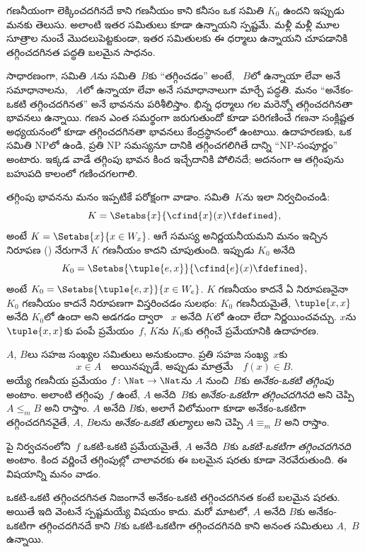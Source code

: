 \documentclass[../../../include/open-logic-section]{subfiles}
\begin{document}

\begin{explain}
గణనీయంగా లెక్కించదగినదే కాని గణనీయం కాని కనీసం ఒక సమితి $K_0$
ఉందని ఇప్పుడు మనకు తెలుసు. అలాంటి ఇతర సమితులు కూడా ఉన్నాయని స్పష్టమే.
మళ్లీ మళ్లీ మూల సూత్రాల నుంచే మొదలుపెట్టకుండా, ఇతర సమితులకు ఈ ధర్మాలు
ఉన్నాయని చూపడానికి తగ్గించదగినత పద్ధతి బలమైన సాధనం.

సాధారణంగా, సమితి $A$ను సమితి~$B$కు ``తగ్గించడం'' అంటే,
~$B$లో ఉన్నాయా లేవా అనే సమాధానాలను,
~$A$లో ఉన్నాయా లేవా అనే
సమాధానాలుగా మార్చే పద్ధతి. మనం ``అనేకం-ఒకటి తగ్గించదగినత'' అనే
భావనను పరిశీలిస్తాం. భిన్న ధర్మాలు గల మరెన్నో తగ్గించదగినతా
భావనలు ఉన్నాయి. గణన ఎంత సమర్థంగా జరుగుతుందో కూడా పరిగణించే గణనా సంక్లిష్టత
అధ్యయనంలో కూడా తగ్గించదగినతా భావనలు కేంద్రస్థానంలో ఉంటాయి. ఉదాహరణకు,
ఒక సమితి NPలో ఉండి, ప్రతి NP సమస్యనూ దానికి తగ్గించగలిగితే దాన్ని
``NP-సంపూర్ణం'' అంటారు. ఇక్కడ వాడే తగ్గింపు భావన కింద ఇచ్చేదానికి
పోలినదే; అదనంగా ఆ తగ్గింపును బహుపది కాలంలో గణించగలగాలి.

తగ్గింపు భావనను మనం ఇప్పటికే పరోక్షంగా వాడాం. సమితి~$K$ను ఇలా
నిర్వచించండి:
\[
K = \Setabs{x}{\cfind{x}(x) \fdefined},
\]
అంటే $K=\Setabs{x}{x\in W_x}$. ఆగే సమస్య అనిర్ణయనీయమని మనం ఇచ్చిన
నిరూపణ () నేరుగానే $K$ గణనీయం
కాదని చూపుతుంది.
ఇప్పుడు $K_0$ అనేది
\[
K_0 = \Setabs{\tuple{e, x}}{\cfind{e}(x) \fdefined},
\]
అంటే $K_0=\Setabs{\tuple{e,x}}{x\in W_e}$. $K$ గణనీయం కాదనే ఏ
నిరూపణనైనా $K_0$ గణనీయం కాదనే నిరూపణగా విస్తరించడం సులభం:
$K_0$ గణనీయమైతే, $\tuple{x,x}$ అనేది $K_0$లో ఉందా అని అడగడం ద్వారా
~$x$ అనేది $K$లో ఉందా లేదా
నిర్ణయించవచ్చు. $x$ను $\tuple{x,x}$కు
పంపే ప్రమేయం~$f$, $K$ను $K_0$కు తగ్గించే ప్రమేయానికి ఉదాహరణ.
\end{explain}

\begin{defn}
$A$, $B$లు సహజ సంఖ్యల సమితులు అనుకుందాం. ప్రతి సహజ సంఖ్య~$x$కు
\[
x \in A \quad \text{అయినప్పుడే, అప్పుడు మాత్రమే} \quad f(x) \in B.
\]
అయ్యే గణనీయ ప్రమేయం $f\colon\Nat\to\Nat$ను $A$ నుంచి~$B$కు
\emph{అనేకం-ఒకటి తగ్గింపు} అంటాం. అలాంటి తగ్గింపు~$f$ ఉంటే, $A$
అనేది~$B$కు \emph{అనేకం-ఒకటిగా తగ్గించదగినది} అని చెప్పి
$A\leq_m B$ అని రాస్తాం. $A$ అనేది $B$కు, అలాగే విలోమంగా కూడా
అనేకం-ఒకటిగా తగ్గించదగినవైతే, $A$, $B$లను \emph{అనేకం-ఒకటి
తుల్యాలు} అని చెప్పి $A\equiv_m B$ అని రాస్తాం.
\end{defn}

పై నిర్వచనంలోని~$f$ ఒకటి-ఒకటి ప్రమేయమైతే, $A$ అనేది~$B$కు
\emph{ఒకటి-ఒకటిగా తగ్గించదగినది} అంటాం. కింద వర్ణించే తగ్గింపుల్లో
చాలావరకు ఈ బలమైన షరతు కూడా నెరవేరుతుంది. ఈ విషయాన్ని మనం
వాడం.

\begin{digress}
ఒకటి-ఒకటి తగ్గించదగినత నిజంగానే అనేకం-ఒకటి తగ్గించదగినత కంటే బలమైన
షరతు. అయితే ఇది వెంటనే స్పష్టమయ్యే విషయం కాదు. మరో మాటలో,
$A$ అనేది $B$కు అనేకం-ఒకటిగా తగ్గించదగినదే కాని $B$కు ఒకటి-ఒకటిగా
తగ్గించదగినది కాని అనంత సమితులు $A$,~$B$ ఉన్నాయి.
\end{digress}
\end{document}
